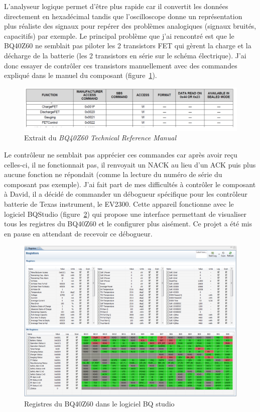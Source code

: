 \documentclass[a4paper, 12pt, sffamily]{report}
\begin{document}
L’analyseur logique permet d’être plus rapide car il convertit les données directement en hexadécimal tandis que l’oscilloscope donne un représentation plus réaliste des signaux pour repérer des problèmes analogiques (signaux bruités, capacitifs) par exemple.
Le principal problème que j’ai rencontré est que le BQ40Z60 ne semblait pas piloter les 2 transistors FET qui gèrent la charge et la décharge de la batterie (les 2 transistors en série sur le schéma électrique).
J’ai donc essayer de contrôler ces transistors manuellement avec des commandes expliqué dans le manuel du composant (figure~\ref{fig:BQ40Z60_manual_excerpt}).

\begin{figure}[H]
\centering
\includegraphics[scale=0.82]{figures/screenshots/BQ40Z60_manual_excerpt.png}
\caption{Extrait du \emph{BQ40Z60 Technical Reference Manual}\cite{BQ40Z60_tech_manual}} 
\label{fig:BQ40Z60_manual_excerpt}
\end{figure}

Le contrôleur ne semblait pas apprécier ces commandes car après avoir reçu celles-ci, il ne fonctionnait pas, il renvoyait un NACK au lieu d’un ACK puis plus aucune fonction ne répondait (comme la lecture du numéro de série du composant pas exemple).
J’ai fait part de mes difficultés à contrôler le composant à David, il a décidé de commander un débogueur spécifique pour les contrôleur batterie de Texas instrument, le EV2300. Cette appareil fonctionne avec le logiciel BQStudio (figure~\ref{fig:BQ40Z60_registers}) qui propose une interface permettant de visualiser tous les registres du BQ40Z60 et le configurer plus aisément. Ce projet a été mis en pause en attendant de recevoir ce débogueur.

\begin{figure}[H]
\centering
\includegraphics[scale=0.4]{figures/screenshots/BQ40Z60_registers.png}
\caption{Registres du BQ40Z60 dans le logiciel BQ studio}
\label{fig:BQ40Z60_registers}
\end{figure}
\end{document}
